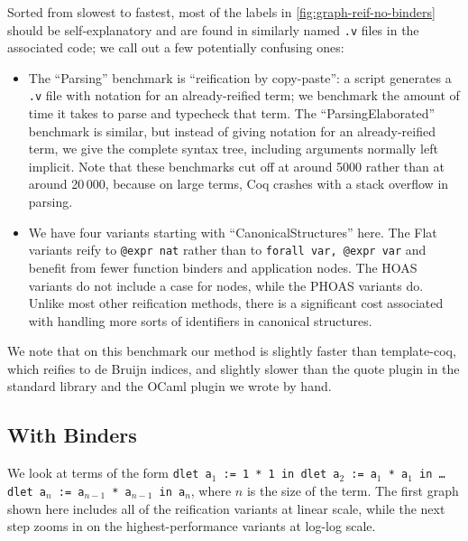 Sorted from slowest to fastest, most of the labels in \autoref{fig:graph-reif-no-binders} should be self-explanatory and are found in similarly named \texttt{.v} files in the associated code; we call out a few potentially confusing ones:
\begin{itemize}
  \item
    The ``Parsing'' benchmark is ``reification by copy-paste'': a script generates a \texttt{.v} file with notation for an already-reified term; we benchmark the amount of time it takes to parse and typecheck that term.
    The ``ParsingElaborated'' benchmark is similar, but instead of giving notation for an already-reified term, we give the complete syntax tree, including arguments normally left implicit.
    Note that these benchmarks cut off at around 5000 rather than at around 20\,000, because on large terms, Coq crashes with a stack overflow in parsing.
  \item
    We have four variants starting with ``CanonicalStructures'' here.
    The Flat variants reify to \texttt{@expr nat} rather than to \texttt{forall var, @expr var} and benefit from fewer function binders and application nodes.
    The HOAS variants do not include a case for \space nodes, while the PHOAS variants do.
    Unlike most other reification methods, there is a significant cost associated with handling more sorts of identifiers in canonical structures.
\end{itemize}

We note that on this benchmark our method is slightly faster than template-coq, which reifies to de Bruijn indices, and slightly slower than the quote plugin in the standard library and the OCaml plugin we wrote by hand.

\subsection{With Binders} \label{sec:perf:binders}

We look at terms of the form \texttt{dlet a$_1$ := 1 * 1 in dlet a$_2$ := a$_1$ * a$_1$ in \ldots\space dlet a$_n$ := a$_{n-1}$ * a$_{n-1}$ in a$_n$}, where $n$ is the size of the term.
The first graph shown here includes all of the reification variants at linear scale, while the next step zooms in on the highest-performance variants at log-log scale.

